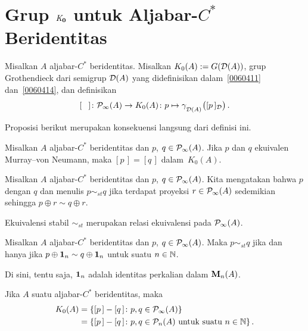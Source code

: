 \section{Grup $\mathbf{\emph{K}_0}$ untuk Aljabar-$C^*$ Beridentitas}

\begin{defn} Misalkan $A$ aljabar-$C^*$ beridentitas. Misalkan
$K_0(A) := G(\mathcal{D}(A))$, grup Grothendieck dari semigrup $\mathcal{D}(A)$ yang didefinisikan dalam~\ref{0060411} dan~\ref{0060414},
dan definisikan
   \[ [\hphantom{P}]\colon \mathcal{P}_\infty(A) \rightarrow K_0(A)
           \colon p \mapsto \gamma_{{}_{\scriptstyle{\mathcal{D}(A)}}}\bigl([p\,]_{\mathcal{D}}\bigr)\,. \]
\end{defn}

Proposisi berikut merupakan konsekuensi langsung dari definisi ini.

\begin{prop}\label{0062188fa} Misalkan $A$ aljabar-$C^*$ beridentitas dan $p$, $q \in \mathcal{P}_\infty(A)$. Jika $p$ dan $q$
ekuivalen Murray--von Neumann, maka $[p\,] = [q\,]$ dalam~$K_0(A)$.
\end{prop}

\begin{defn} Misalkan $A$ aljabar-$C^*$ beridentitas dan $p$, $q \in \mathcal{P}_\infty(A)$. Kita mengatakan bahwa $p$
 dengan $q$ dan menulis
$p \sim_{st} q$ jika terdapat proyeksi $r \in \mathcal{P}_\infty(A)$ sedemikian sehingga $p \oplus r \sim q \oplus r$.
\end{defn}

\begin{prop} Ekuivalensi stabil $\sim_{st}$ merupakan relasi ekuivalensi pada $\mathcal{P}_\infty(A)$.
\end{prop}

\begin{prop} Misalkan $A$ aljabar-$C^*$ beridentitas dan $p$, $q \in \mathcal{P}_\infty(A)$. Maka $p
\sim_{st} q$ jika dan hanya jika $p \oplus \mathbf{1}_n \sim q \oplus \mathbf{1}_n$ untuk suatu $n \in \mathbb{N}$.
\end{prop}

Di sini, tentu saja, $\mathbf{1}_n$ adalah identitas perkalian dalam $\mathbf{M}_{n}({A})$.

\begin{prop}\label{0062224} Jika $A$ suatu
aljabar-$C^*$ beridentitas, maka
   \begin{align*}
         K_0(A) &= \{ [p\,] - [q\,]\colon p,q \in \mathcal{P}_\infty(A)\}  \\
                &= \{ [p\,] - [q\,]\colon  p,q \in \mathcal{P}_n(A) \text{ untuk suatu $n \in \mathbb{N}$}\}\,.
   \end{align*}
\end{prop}

